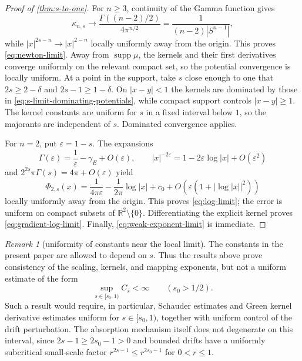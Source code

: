 \documentclass[reqno]{amsart}
\numberwithin{equation}{section}
\theoremstyle{plain}
\theoremstyle{definition}
\theoremstyle{remark}
\newtheorem{remark}[theorem]{Remark}
\newcommand{\R}{\mathbb R}
\newcommand{\rev}[1]{#1}
\begin{document}
\begin{proof}[Proof of \cref{thm:s-to-one}]
For $n\ge3$, continuity of the Gamma function gives
\[
 \kappa_{n,s}\longrightarrow
 \frac{\Gamma((n-2)/2)}{4\pi^{n/2}}
 =\frac{1}{(n-2)|S^{n-1}|},
\]
while $|x|^{2s-n}\to|x|^{2-n}$ locally uniformly away from the origin.
This proves \eqref{eq:newton-limit}.  Away from
$\operatorname{supp}\mu$, the kernels and their first derivatives converge
uniformly on the relevant compact set, so the potential convergence is
locally uniform.  At a point in the support, take $s$ close enough to one
that $2s\ge2-\delta$ and $2s-1\ge1-\delta$.  On $|x-y|<1$ the kernels
are dominated by those in \eqref{eq:s-limit-dominating-potentials}, while
compact support controls $|x-y|\ge1$.  \rev{The kernel constants are
uniform for $s$ in a fixed interval below $1$, so the majorants are
independent of $s$.}  Dominated
convergence applies.

For $n=2$, put $\varepsilon=1-s$.  The expansions
\[
 \Gamma(\varepsilon)=\frac1\varepsilon-\gamma_E+O(\varepsilon),
 \qquad |x|^{-2\varepsilon}=1-2\varepsilon\log|x|+O(\varepsilon^2)
\]
and $2^{2s}\pi\Gamma(s)=4\pi+O(\varepsilon)$ yield
\[
 \Phi_{2,s}(x)=\frac{1}{4\pi\varepsilon}
 -\frac{1}{2\pi}\log|x|+c_0+O(\varepsilon(1+|\log|x||^2))
\]
locally uniformly away from the origin.  This proves
\eqref{eq:log-limit}; \rev{the error is uniform on compact subsets of
$\R^2\setminus\{0\}$.}
Differentiating the explicit kernel proves
\eqref{eq:gradient-log-limit}.  Finally,
\eqref{eq:weak-exponent-limit} is immediate.
\end{proof}

\begin{remark}[uniformity of constants near the local limit]
\label{rem:uniform-s}
The constants in the present paper are allowed to depend on $s$.  Thus the
results above prove consistency of the scaling, kernels, and mapping
exponents, but not a uniform estimate of the form
\[
 \sup_{s\in[s_0,1)}C_s<\infty
 \qquad(s_0>1/2).
\]
Such a result would require, in particular, Schauder estimates and Green
kernel derivative estimates uniform for $s\in[s_0,1)$, together with
uniform control of the drift perturbation.  The absorption mechanism itself
does not degenerate on this interval, since $2s-1\ge2s_0-1>0$ and bounded
drifts have a uniformly subcritical small-scale factor
$r^{2s-1}\le r^{2s_0-1}$ for $0<r\le1$.
\end{remark}
\end{document}
